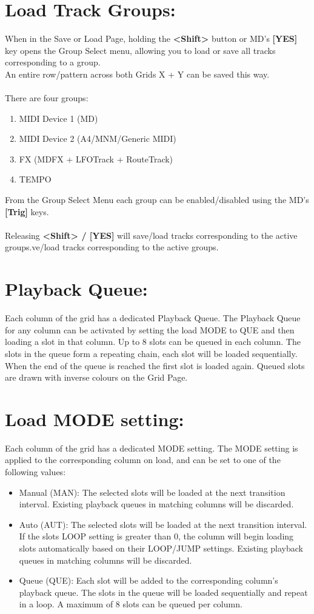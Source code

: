 \section{Load Track Groups:}
When in the Save or Load Page, holding the \textbf{<Shift>} button or MD's \textbf{[YES]} key opens the Group Select menu,
allowing you to load or save all tracks corresponding to a group.\\An entire row/pattern across both Grids X + Y can be saved this way.\\
\\
There are four groups:
\begin{enumerate}
    \item MIDI Device 1 (MD)
    \item MIDI Device 2 (A4/MNM/Generic MIDI)
    \item FX (MDFX + LFOTrack + RouteTrack)
    \item TEMPO
\end{enumerate}
From the Group Select Menu each group can be enabled/disabled using the MD's \textbf{[Trig]} keys.\\
\\
Releasing \textbf{<Shift> / [YES]} will save/load tracks corresponding to the active groups.ve/load tracks corresponding to the active groups.
\newpage

\section{Playback Queue:}
Each column of the grid has a dedicated Playback Queue. The Playback Queue for any column can be activated by setting the load MODE to QUE and then loading a slot in that column. Up to 8 slots can be queued in each column.  The slots in the queue form a repeating chain, each slot will be loaded sequentially. When the end of the queue is reached the first slot is loaded again. Queued slots are drawn with inverse colours on the Grid Page.
   
\section{Load MODE setting:}
Each column of the grid has a dedicated MODE setting. The MODE setting is applied to the corresponding column on load, and can be set to one of the following values:

\begin{itemize}
    \item Manual (MAN):  The selected slots will be loaded at the next transition interval. Existing playback queues in matching columns will be discarded.
    \item Auto (AUT): The selected slots will be loaded at the next transition interval. If the slots LOOP setting is greater than 0, the column will begin loading slots automatically based on their LOOP/JUMP settings. Existing playback queues in matching columns will be discarded.
    \item Queue (QUE): Each slot will be added to the corresponding column's playback queue. The slots in the queue will be loaded sequentially and repeat in a loop. A maximum of 8 slots can be queued per column. 
\end{itemize}

